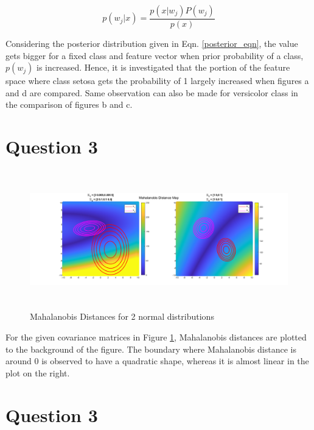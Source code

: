 \documentclass[11pt]{extarticle}
\begin{document}
\begin{equation}
    p(w_j|x) = \frac{p(x|w_j)P(w_j)}{p(x)}
    \label{posterior_eqn}
\end{equation}

Considering the posterior distribution given in Eqn. \ref{posterior_eqn}, the value gets bigger for a fixed class and feature vector
when prior probability of a class, $p(w_j)$ is increased. Hence, it is investigated that the portion of the feature space where class
setosa gets the probability of 1 largely increased when figures a and d are compared. Same observation can also be made for 
versicolor class in the comparison of figures b and c.

\pagebreak 

\section*{Question 3}

{\centering
    \begin{figure}[h]
        \includegraphics[width=16cm, height=6cm]{mahal.png}
        \caption{Mahalanobis Distances for 2 normal distributions}
        \label{fig:q3figure}
    \end{figure}
}

For the given covariance matrices in Figure \ref{fig:q3figure}, Mahalanobis distances are plotted to the
background of the figure. The boundary where Mahalanobis distance is around 0 is observed to have a 
quadratic shape, whereas it is almost linear in the plot on the right. 


\pagebreak

\section*{Question 3}
\end{document}
